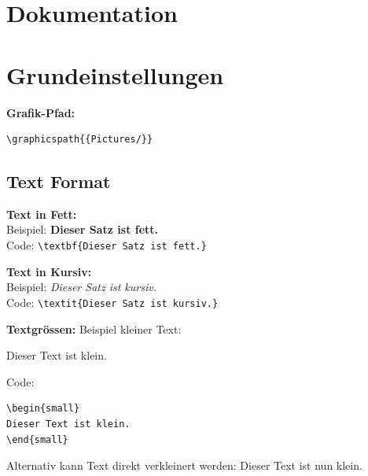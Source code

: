 
\section{Dokumentation}


\section{Grundeinstellungen}

\textbf{Grafik-Pfad:}
\begin{verbatim}
\graphicspath{{Pictures/}}
\end{verbatim}

\vspace{\baselineskip}

\pagebreak
\subsection{Text Format}

\textbf{Text in Fett:}\\ Beispiel: \textbf{Dieser Satz ist fett.}\\ Code: \verb+\textbf{Dieser Satz ist fett.}+

\vspace{\baselineskip}

\textbf{Text in Kursiv:}\\ Beispiel: \textit{Dieser Satz ist kursiv.}\\ Code: \verb+\textit{Dieser Satz ist kursiv.}+

\vspace{\baselineskip}

\textbf{Textgrössen:}
Beispiel kleiner Text:
\begin{small}
Dieser Text ist klein.
\end{small}

Code:
\begin{verbatim}
\begin{small}
Dieser Text ist klein.
\end{small}
\end{verbatim}

Alternativ kann Text direkt verkleinert werden: \small{Dieser Text ist nun klein.} \normalsize{}

